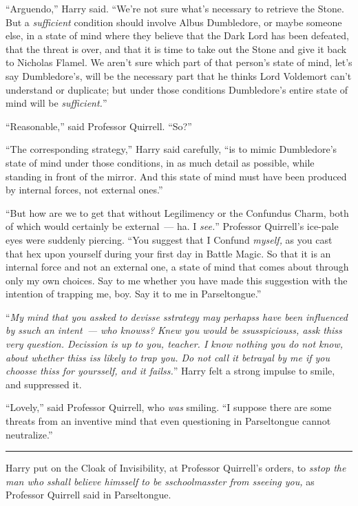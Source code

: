 ``Arguendo,'' Harry said. ``We're not sure what's necessary to retrieve the Stone. But a \emph{sufficient} condition should involve Albus Dumbledore, or maybe someone else, in a state of mind where they believe that the Dark Lord has been defeated, that the threat is over, and that it is time to take out the Stone and give it back to Nicholas Flamel. We aren't sure which part of that person's state of mind, let's say Dumbledore's, will be the necessary part that he thinks Lord Voldemort can't understand or duplicate; but under those conditions Dumbledore's entire state of mind will be \emph{sufficient.}''

``Reasonable,'' said Professor Quirrell. ``So?''

``The corresponding strategy,'' Harry said carefully, ``is to mimic Dumbledore's state of mind under those conditions, in as much detail as possible, while standing in front of the mirror. And this state of mind must have been produced by internal forces, not external ones.''

``But how are we to get that without Legilimency or the Confundus Charm, both of which would certainly be external~--- ha. I \emph{see.}'' Professor Quirrell's ice-pale eyes were suddenly piercing. ``You suggest that I Confund \emph{myself,} as you cast that hex upon yourself during your first day in Battle Magic. So that it is an internal force and not an external one, a state of mind that comes about through only my own choices. Say to me whether you have made this suggestion with the intention of trapping me, boy. Say it to me in Parseltongue.''

``\emph{My mind that you assked to devisse sstrategy may perhapss have been influenced by ssuch an intent~--- who knowss? Knew you would be ssusspiciouss, assk thiss very question. Decission is up to you, teacher. I know nothing you do not know, about whether thiss iss likely to trap you. Do not call it betrayal by me if you choosse thiss for yoursself, and it failss.}'' Harry felt a strong impulse to smile, and suppressed it.

``Lovely,'' said Professor Quirrell, who \emph{was} smiling. ``I suppose there are some threats from an inventive mind that even questioning in Parseltongue cannot neutralize.''

\begin{center}\rule{3in}{0.4pt}\end{center}

Harry put on the Cloak of Invisibility, at Professor Quirrell's orders, to \emph{sstop the man who sshall believe himsself to be sschoolmasster from sseeing you,} as Professor Quirrell said in Parseltongue.


